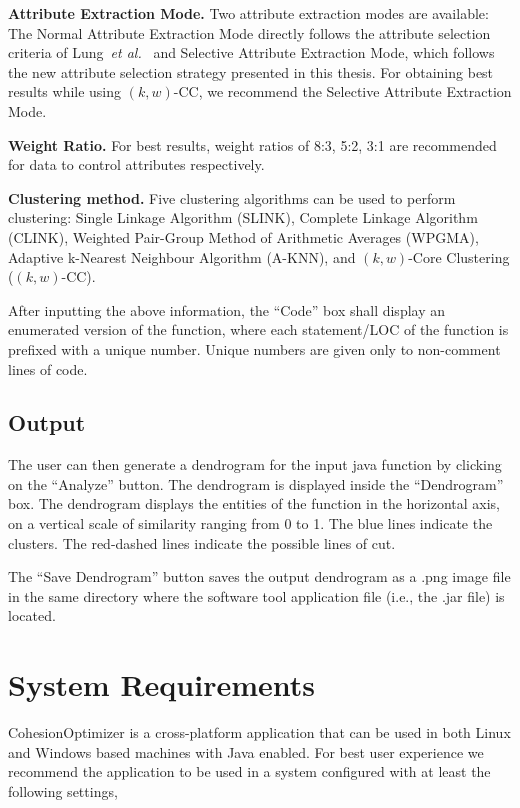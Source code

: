 \textbf{Attribute Extraction Mode.} Two attribute extraction modes are available: The Normal Attribute Extraction Mode directly follows the attribute selection criteria of Lung~\textit{et al.}~\cite{LXZS06} and Selective Attribute Extraction Mode, which follows the new attribute selection strategy presented in this thesis. For obtaining best results while using $(k,w)$-CC, we recommend the Selective Attribute Extraction Mode. 

\textbf{Weight Ratio.} For best results, weight ratios of 8:3, 5:2, 3:1 are recommended for data to control attributes respectively.

\textbf{Clustering method.} Five clustering algorithms can be used to perform clustering: Single Linkage Algorithm (SLINK), Complete Linkage Algorithm (CLINK), Weighted Pair-Group Method of Arithmetic Averages (WPGMA), Adaptive k-Nearest Neighbour Algorithm (A-KNN), and $(k,w)$-Core Clustering ($(k,w)$-CC).

\vspace*{10pt} 

After inputting the above information, the ``Code'' box shall display an enumerated version of the function, where each statement/LOC of the function is prefixed with a unique number. Unique numbers are given only to non-comment lines of code. 
 
\subsection{Output}
The user can then generate a dendrogram for the input java function by clicking on the ``Analyze'' button. The dendrogram is displayed inside the ``Dendrogram'' box. The dendrogram displays the entities of the function in the horizontal axis, on a vertical scale of similarity ranging from 0 to 1. The blue lines indicate the clusters. The red-dashed lines indicate the possible lines of cut. 

The ``Save Dendrogram'' button saves the output dendrogram as a .png image file in the same directory where the software tool application file (i.e., the .jar file) is located.

\section{System Requirements}
\label{sec:SystReq}

CohesionOptimizer is a cross-platform application that can be used in both Linux and Windows based machines with Java enabled. For best user experience we recommend the application to be used in a system configured with at least the following settings,

